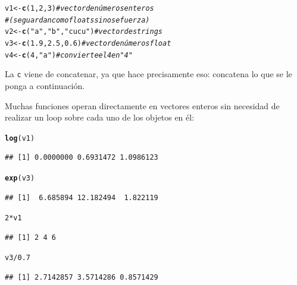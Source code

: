 \documentclass{config/apuntes}\usepackage[]{graphicx}\usepackage[]{xcolor}
\makeatletter
\newcommand{\hlnum}[1]{\textcolor[rgb]{0.686,0.059,0.569}{#1}}%
\newcommand{\hlsng}[1]{\textcolor[rgb]{0.192,0.494,0.8}{#1}}%
\newcommand{\hlcom}[1]{\textcolor[rgb]{0.678,0.584,0.686}{\textit{#1}}}%
\newcommand{\hlopt}[1]{\textcolor[rgb]{0,0,0}{#1}}%
\newcommand{\hldef}[1]{\textcolor[rgb]{0.345,0.345,0.345}{#1}}%
\newcommand{\hlkwb}[1]{\textcolor[rgb]{0.69,0.353,0.396}{#1}}%
\newcommand{\hlkwd}[1]{\textcolor[rgb]{0.737,0.353,0.396}{\textbf{#1}}}%
\newenvironment{kframe}{%
 \def\at@end@of@kframe{}%
 \ifinner\ifhmode%
  \def\at@end@of@kframe{\end{minipage}}%
  \begin{minipage}{\columnwidth}%
 \fi\fi%
 \def\FrameCommand##1{\hskip\@totalleftmargin \hskip-\fboxsep
 \colorbox{shadecolor}{##1}\hskip-\fboxsep
     \hskip-\linewidth \hskip-\@totalleftmargin \hskip\columnwidth}%
 \MakeFramed {\advance\hsize-\width
   \@totalleftmargin\z@ \linewidth\hsize
   \@setminipage}}%
 {\par\unskip\endMakeFramed%
 \at@end@of@kframe}
\newenvironment{knitrout}{}{} %
\newcommand{\code}[1]{\texttt{#1}}
\makeatother
\begin{document}
\begin{knitrout}
\color{fgcolor}\begin{kframe}
\begin{alltt}
\hldef{v1} \hlkwb{<-} \hlkwd{c}\hldef{(}\hlnum{1}\hldef{,} \hlnum{2}\hldef{,} \hlnum{3}\hldef{)} \hlcom{#vector de números enteros }
\hlcom{#               (se guardan como floats si no se fuerza)}
\hldef{v2} \hlkwb{<-} \hlkwd{c}\hldef{(}\hlsng{"a"}\hldef{,} \hlsng{"b"}\hldef{,} \hlsng{"cucu"}\hldef{)} \hlcom{#vector de strings}
\hldef{v3} \hlkwb{<-} \hlkwd{c}\hldef{(}\hlnum{1.9}\hldef{,} \hlnum{2.5}\hldef{,} \hlnum{0.6}\hldef{)} \hlcom{#vector de números float}
\hldef{v4} \hlkwb{<-} \hlkwd{c}\hldef{(}\hlnum{4}\hldef{,} \hlsng{"a"}\hldef{)} \hlcom{#convierte el 4 en "4"}
\end{alltt}
\end{kframe}
\end{knitrout}

La \code{c} viene de concatenar, ya que hace precisamente eso: concatena lo que se le ponga a continuación. 

Muchas funciones operan directamente en vectores enteros sin necesidad de realizar un loop sobre cada uno de los objetos en él:
\begin{knitrout}
\color{fgcolor}\begin{kframe}
\begin{alltt}
\hlkwd{log}\hldef{(v1)}
\end{alltt}
\begin{verbatim}
## [1] 0.0000000 0.6931472 1.0986123
\end{verbatim}
\begin{alltt}
\hlkwd{exp}\hldef{(v3)}
\end{alltt}
\begin{verbatim}
## [1]  6.685894 12.182494  1.822119
\end{verbatim}
\begin{alltt}
\hlnum{2} \hlopt{*} \hldef{v1}
\end{alltt}
\begin{verbatim}
## [1] 2 4 6
\end{verbatim}
\begin{alltt}
\hldef{v3}\hlopt{/}\hlnum{0.7}
\end{alltt}
\begin{verbatim}
## [1] 2.7142857 3.5714286 0.8571429
\end{verbatim}
\end{kframe}
\end{knitrout}
\end{document}
